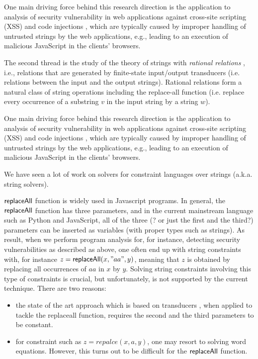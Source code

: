 One main driving force behind this research direction is the application to analysis of security vulnerability
in web applications against cross-site scripting (XSS) and code injections 
\cite{??}, which 
are typically caused by improper handling of untrusted strings by the web 
applications, e.g., leading to an execution of malicious JavaScript in the 
clients' browsers. 

The second thread
is the study of the theory of strings with \emph{rational relations} \cite{??},
i.e., relations that are generated by finite-state input/output transducers
(i.e. relations between the input and the output strings). Rational relations
form a natural class of string operations including the replace-all function
(i.e. replace every occurrence of a substring $v$ in the input string by a
string $w$). 



One main driving force behind 
this research direction is the application to analysis of security vulnerability
in web applications against cross-site scripting (XSS) and code injections 
\cite{??}, which 
are typically caused by improper handling of untrusted strings by the web 
applications, e.g., leading to an execution of malicious JavaScript in the 
clients' browsers. 

We have seen  a lot of work on solvers for constraint languages over strings (a.k.a. string solvers). 


$\mathsf{replaceAll}$ function is widely used in Javascript programs. In general, the $\mathsf{replaceAll}$ function has three parameters, and in the current mainstream language such as Python and JavaScript, all of the three (? or just the first and the third?) parameters can be inserted as variables (with proper types such as strings). As result, when we perform program analysis for, for instance, detecting security vulnerabilities as described as above, one often end up with string constraints with, for instance $z=\mathsf{replaceAll}(x,"aa", y)$, meaning that $z$ is obtained by replacing all occurrences of $aa$ in $x$ by $y$. Solving string constraints involving this type of constraints is crucial, but unfortunately, is not supported by the current technique. There are two reasons:
\begin{itemize}
	\item the state of the art approach which is based on transducers \cite{LB16}, when applied to tackle the replaceall function, requires the second and the third parameters to be constant. 
	
	\item for constraint such as $z=repalce(x,a,y)$, one may resort to solving word equations. However, this turns out to be difficult for the $\mathsf{replaceAll}$ function.   
\end{itemize}

